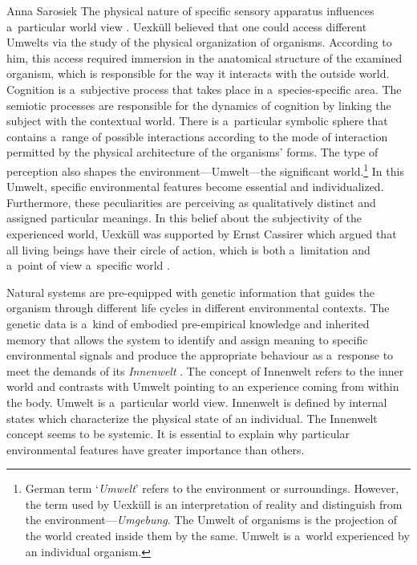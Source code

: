 \begin{artengenv}{Anna Sarosiek}
The physical nature of specific sensory apparatus influences a~particular world view
\parencite[][p.22]{uexkull_streifzuge_1934}. %
 Uexküll believed that one could access different Umwelts via the study of the physical organization of organisms. According to him, this access required immersion in the anatomical structure of the examined organism, which is responsible for the way it interacts with the outside world. Cognition is a~subjective process that takes place in a~species-specific area. The semiotic processes are responsible for the dynamics of cognition by linking the subject with the contextual world. There is a~particular symbolic sphere that contains a~range of possible interactions according to the mode of interaction permitted by the physical architecture of the organisms’ forms. The type of perception also shapes the environment---Umwelt---the significant world.\footnote{German term ‘\textit{Umwelt}’ refers to the environment or surroundings. However, the term used by Uexküll is an interpretation of reality and distinguish from the environment---\textit{Umgebung}. The Umwelt of organisms is the projection of the world created inside them by the same. Umwelt is a~world experienced by an individual organism.} In this Umwelt, specific environmental features become essential and individualized. Furthermore, these peculiarities are perceiving as qualitatively distinct and assigned particular meanings. In this belief about the subjectivity of the experienced world, Uexküll was supported by Ernst Cassirer which argued that all living beings have their circle of action, which is both a~limitation and a~point of view a~specific world 
\parencite[][]{cassirer_philosophy_1996}.%


Natural systems are pre-equipped with genetic information that guides the organism through different life cycles in different environmental contexts. The genetic data is a~kind of embodied pre-empirical knowledge and inherited memory that allows the system to identify and assign meaning to specific environmental signals and produce the appropriate behaviour as a~response to meet the demands of its \textit{Innenwelt}
\parencite[][p.46]{uexkull_umwelt_1921}. %
 The concept of Innenwelt refers to the inner world and contrasts with Umwelt pointing to an experience coming from within the body. Umwelt is a~particular world view. Innenwelt is defined by internal states which characterize the physical state of an individual. The Innenwelt concept seems to be systemic. It is essential to explain why particular environmental features have greater importance than others.


\end{artengenv}

